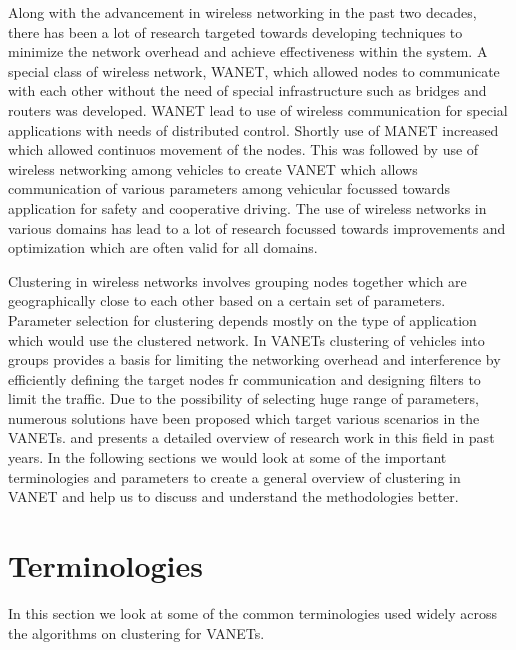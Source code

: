 \documentclass[]{ccs-thesis}
\begin{document}
Along with the advancement in wireless networking in the past two decades, there has been a lot of research targeted
towards developing techniques to minimize the network overhead and achieve effectiveness within the system. A special
class of wireless network, \ac{WANET},  which allowed nodes to communicate with each other without the need of
special infrastructure such as bridges and routers was developed. \ac{WANET} lead to use of wireless communication
for special applications with needs of distributed control. Shortly use of \ac{MANET} increased which allowed
continuos movement of the nodes. This was followed by use of wireless networking among vehicles to create \ac{VANET}
which allows communication of various parameters among vehicular focussed towards application for safety and cooperative
driving. The use of wireless networks in various domains has lead to a lot of research focussed towards improvements
and optimization which are often valid for all domains.

Clustering in wireless networks involves grouping nodes together which are geographically close to each other based on a
certain set of parameters. Parameter selection for clustering depends mostly on the type of application which would use
the clustered network. In \ac{VANET}s clustering of vehicles into groups provides a basis for limiting the networking
overhead and interference by efficiently defining the target nodes fr communication and designing filters to limit the traffic.
Due to the possibility of selecting huge range of parameters, numerous solutions have been proposed which target various
scenarios in the \ac{VANET}s. \cite{6256251} and \cite{BALI2014134} presents a detailed overview of research work in this
field in past years. In the following sections we would look at some of the important terminologies and parameters to create
a general overview of clustering in \ac{VANET} and help us to discuss and understand the methodologies better.

\section{Terminologies}

In this section we look at some of the common terminologies used widely across the algorithms
on clustering for \ac{VANET}s.
\end{document}
